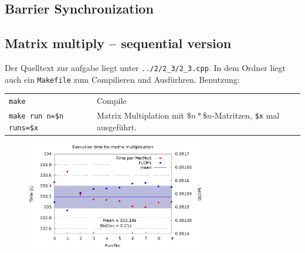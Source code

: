 \documentclass[a4paper,11pt]{scrartcl}
\begin{document}
\subsection{Barrier Synchronization}


\subsection{Matrix multiply – sequential version}

Der Quelltext zur aufgabe liegt unter \verb+../2/2_3/2_3.cpp+. In dem Ordner liegt auch ein \verb+Makefile+ zum Compilieren und Ausfürhren. Benutzung: 

\begin{table}[h!]
    \begin{tabular}{ll}
    \verb+make+& Compile \\ 
    \verb+make run n=$n runs=$x+ & Matrix Multiplation mit $\$n*\$n$-Matritzen, \verb+$x+ mal ausgeführt.\\
    \end{tabular}
\end{table}


\begin{figure}[h!]
    \centering
    \includegraphics[width=0.7\textwidth,keepaspectratio]{2_3/data/matmult.eps}
\end{figure}
\end{document}
